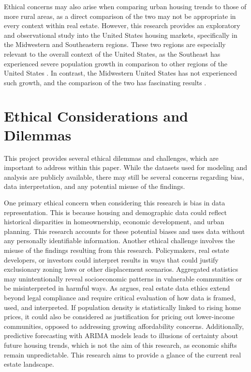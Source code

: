 \documentclass[journal,article,submit,pdftex,moreauthors]{Definitions/mdpi}
\begin{document}
Ethical concerns may also arise when comparing urban housing trends to those of more rural areas, as a direct comparison of the two may not be appropriate in every context within real estate. However, this research provides an exploratory and observational study into the United States housing markets, specifically in the Midwestern and Southeastern regions. These two regions are especially relevant to the overall context of the United States, as the Southeast has experienced severe population growth in comparison to other regions of the United States \citep{biernackalievestro_2023_southern}. In contrast, the Midwestern United States has not experienced such growth, and the comparison of the two has fascinating results \citep{maynard_2021_population}.

\section{Ethical Considerations and Dilemmas}


This project provides several ethical dilemmas and challenges, which are important to address within this paper. While the datasets used for modeling and analysis are publicly available, there may still be several concerns regarding bias, data interpretation, and any potential misuse of the findings. 

One primary ethical concern when considering this research is bias in data representation. This is because housing and demographic data could reflect historical disparities in homeownership, economic development, and urban planning. This research accounts for these potential biases and uses data without any personally identifiable information. Another ethical challenge involves the misuse of the findings resulting from this research. Policymakers, real estate developers, or investors could interpret results in ways that could justify exclusionary zoning laws or other displacement scenarios. Aggregated statistics may unintentionally reveal socioeconomic patterns in vulnerable communities or be misinterpreted in harmful ways. As \citet{brinkmann_2009_putting} argues, real estate data ethics extend beyond legal compliance and require critical evaluation of how data is framed, used, and interpreted. If population density is statistically linked to rising home prices, it could also be considered as justification for pricing out lower-income communities, opposed to addressing growing affordability concerns. Additionally, predictive forecasting with ARIMA models leads to illusions of certainty about future housing trends, which is not the aim of this research, as economic shifts remain unpredictable. This research aims to provide a glance of the current real estate landscape.
\end{document}
